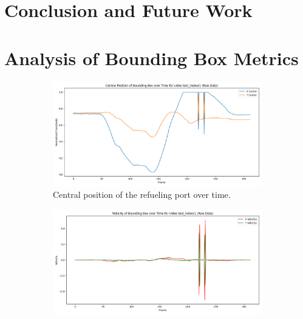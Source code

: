 \documentclass[12pt,oneside]{book} %
\begin{document}
\chapter{Conclusion and Future Work}\label{chap:conclusion}

\appendix
\chapter{Analysis of Bounding Box Metrics}\label{chap:appendix}

\begin{figure}[H]
    \centering
    \begin{subfigure}[t]{0.6\textwidth}
        \includegraphics[width=\textwidth]{figures/bbox_metrics/test_indoor1 (Raw Data)_central_position.png}
        \caption{Central position of the refueling port over time.}
        \label{fig:central-position-test-indoor1}
    \end{subfigure}
    \hfill
    \begin{subfigure}[t]{0.6\textwidth}
        \includegraphics[width=\textwidth]{figures/bbox_metrics/test_indoor1 (Raw Data)_velocity.png}

\end{subfigure}
\end{figure}
\end{document}
